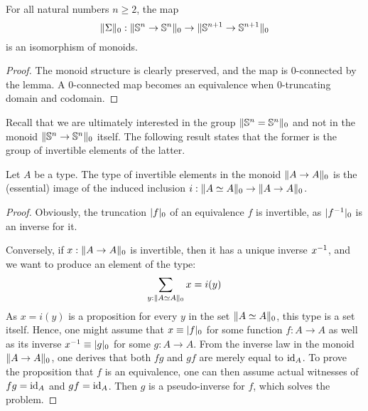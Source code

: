 \documentclass[english,a4]{article}
\newcommand{\setTrunc}[1]{\Trunc{#1}_0}
\newcommand{\settrunc}[1]{\trunc{#1}_0}
\begin{document}
\begin{corollary} \label{cor:higher-spheres-2-comp}
    For all natural numbers $n \geq 2$, the map
    \begin{equation}
    \higherTrunc 0 {\susp} : \higherTrunc 0 {\Sn n \to \Sn n} \to \higherTrunc 0 {\Sn {n+1} \to \Sn {n+1}}
    \end{equation}
    is an isomorphism of monoids.
\end{corollary}
\begin{proof}
    The monoid structure is clearly preserved, and the map is $0$-connected by the lemma. A $0$-connected map becomes an equivalence when $0$-truncating domain and codomain.
\end{proof}

Recall that we are ultimately interested in the group $\setTrunc{\Sn n = \Sn n}$ and not in the monoid $\setTrunc{\Sn n \to \Sn n}$ itself. The following result states that the former is the group of invertible elements of the latter.
\begin{lemma}
    Let $A$ be a type. The type of invertible elements in the monoid $\setTrunc{A \to A}$
    is the (essential) image of the induced inclusion $i:\setTrunc{A \weq A} \to
    \setTrunc{A \to A}$.
    \label{lemma:invertible-truncated-Sn-pointed-weq}
\end{lemma}
\begin{proof}
    Obviously, the truncation $\settrunc{f}$ of an equivalence $f$ is invertible,
    as $\settrunc{\inv f}$ is an inverse for it.
    
    Conversely, if $x:\setTrunc{A \to A}$ is invertible, then 
    it has a unique inverse $\inv x$, and we want to
    produce an element of the type:
    \begin{displaymath}
    \sum_{y:\setTrunc{A \weq A}} x = i(y)
    \end{displaymath}
    As $x=i(y)$ is a proposition for every $y$ in the set $\setTrunc{A
        \weq A}$, this type is a set itself. Hence, one might assume
    that $x \jdeq \settrunc f$ for some function $f:A \to A$ as well
    as its inverse $\inv x \jdeq \settrunc g$ for some $g:A \to A$. 
    From the inverse law in the monoid $\setTrunc{A \to A}$, one
    derives that both $fg$ and $gf$ are merely equal to $\id_{A}$. To prove
    the proposition that $f$ is an equivalence, one can then assume actual
    witnesses of $fg=\id_{A}$ and $gf=\id_{A}$. Then $g$ is a
    pseudo-inverse for $f$, which solves the problem.
\end{proof}
\end{document}
